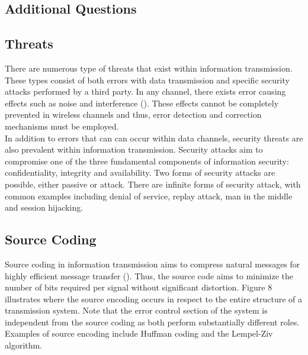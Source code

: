 \documentclass[]{article}
\begin{document}
\break

\vspace*{-0.8cm}
\begin{center}
	\section*{Additional Questions}
\end{center}

\vspace*{0.8cm}
\subsection*{Threats}

There are numerous type of threats that exist within information transmission. These types consist of both errors with data transmission and specific security attacks performed by a third party. In any channel, there exists error causing effects such as noise and interference (\cite{lecture}). These effects cannot be completely prevented in wireless channels and thus, error detection and correction mechanisms must be employed.\\

In addition to errors that can can occur within data channels, security threats are also prevalent within information transmission. Security attacks aim to compromise one of the three fundamental components of information security: confidentiality, integrity and availability. Two forms of security attacks are possible, either passive or attack. There are infinite forms of security attack, with common examples including denial of service, replay attack, man in the middle and session hijacking.

\subsection*{Source Coding}

Source coding in information transmission aims to compress natural messages for highly efficient message transfer (\cite{source_coding}). Thus, the source code aims to minimize the number of bits required per signal without significant distortion. Figure 8 illustrates where the source encoding occurs in respect to the entire structure of a transmission system. Note that the error control section of the system is independent from the source coding as both perform substantially different roles. Examples of source encoding include Huffman coding and the Lempel-Ziv algorithm.
\end{document}
